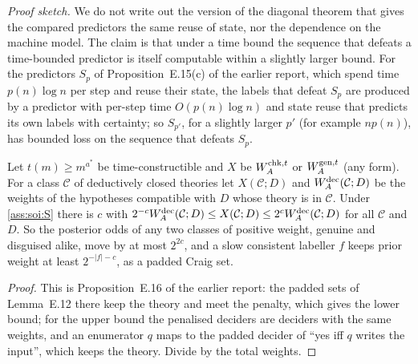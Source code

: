 \begin{remark}\label{rem:soi:freededuction}
\emph{Proof sketch.} We do not write out the version of the diagonal theorem that gives the compared predictors the same reuse of state, nor the dependence on the machine model. The claim is that under a time bound the sequence that defeats a time-bounded predictor is itself computable within a slightly larger bound. For the predictors $S_p$ of Proposition~E.15(c) of the earlier report, which spend time $p(n)\log n$ per step and reuse their state, the labels that defeat $S_p$ are produced by a predictor with per-step time $O(p(n)\log n)$ and state reuse that predicts its own labels with certainty; so $S_{p'}$, for a slightly larger $p'$ (for example $np(n)$), has bounded loss on the sequence that defeats $S_p$.
\end{remark}

\begin{proposition}\label{prop:soi:disguised}
Let $t(m)\ge m^{a^*}$ be time-constructible and $X$ be $W_{A}^{\mathrm{chk},t}$ or $W_{A}^{\mathrm{gen},t}$ (any form). For a class $\mathcal C$ of deductively closed theories let $X(\mathcal C;D)$ and $W_{A}^{\mathrm{dec}}(\mathcal C;D)$ be the weights of the hypotheses compatible with $D$ whose theory is in $\mathcal C$. Under \cref{ass:soi:S} there is $c$ with $2^{-c}W_{A}^{\mathrm{dec}}(\mathcal C;D)\le X(\mathcal C;D)\le2^cW_{A}^{\mathrm{dec}}(\mathcal C;D)$ for all $\mathcal C$ and $D$. So the posterior odds of any two classes of positive weight, genuine and disguised alike, move by at most $2^{2c}$, and a slow consistent labeller $f$ keeps prior weight at least $2^{-\lvert f\rvert-c}$, as a padded Craig set.
\end{proposition}

\begin{proof}
This is Proposition~E.16 of the earlier report: the padded sets of Lemma~E.12 there keep the theory and meet the penalty, which gives the lower bound; for the upper bound the penalised deciders are deciders with the same weights, and an enumerator $q$ maps to the padded decider of ``yes iff $q$ writes the input'', which keeps the theory. Divide by the total weights.
\end{proof}

